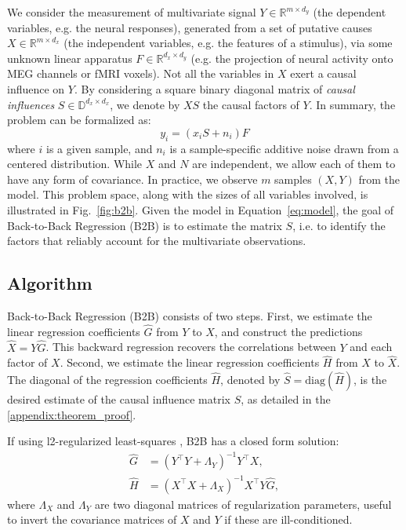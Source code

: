\documentclass[preprint,12pt,3p]{elsarticle}
\begin{document}
We consider the measurement of multivariate signal $Y \in \mathbb{R}^{m \times
d_y}$ (the dependent variables, e.g. the neural responses),
generated from a set of putative causes $X \in \mathbb{R}^{m \times
d_x}$ (the independent variables, e.g. the features of a stimulus),
via some unknown linear apparatus $F \in \mathbb{R}^{d_x \times d_y}$ (e.g. the
projection of neural activity onto MEG channels or fMRI voxels).
%
Not all the variables in $X$ exert a causal influence on $Y$.
%
By considering a square binary diagonal matrix of \emph{causal influences} $S
\in \mathbb{D}^{d_x \times d_x}$, we denote by $XS$ the causal factors of $Y$.
%
In summary, the problem can be formalized as:
%
\begin{equation}
    y_i = (x_i S + n_i) F
    \label{eq:model}
\end{equation}
%
where $i$ is a given sample, and $n_i$ is a sample-specific additive noise drawn from a
centered distribution.
%
While $X$ and $N$ are independent, we allow each of
them to have any form of covariance.
%
In practice, we observe $m$ samples $(X, Y)$ from the model.
%
This problem space, along with the sizes of all variables involved, is
illustrated in Fig.~\ref{fig:b2b}.
%
Given the model in Equation~\cref{eq:model}, the goal of Back-to-Back
Regression (B2B) is to estimate the matrix $S$, i.e. to identify the factors
that reliably account for the multivariate observations.

\subsection{Algorithm}

Back-to-Back Regression (B2B) consists of two steps.
%
First, we estimate the linear regression coefficients $\hat G$ from $Y$ to $X$,
and construct the predictions $\hat X = Y \hat G$.
%
This backward regression recovers the correlations between $Y$ and each factor
of $X$.
%
Second, we estimate the linear regression coefficients $\hat H$ from $X$ to
$\hat X$.
%
The diagonal of the regression coefficients $\hat H$, denoted by $\hat{S} =
\text{diag}(\hat{H})$, is the desired estimate of the causal influence matrix
$S$, as detailed in the \ref{appendix:theorem_proof}.

If using l2-regularized least-squares \citep{hoerl1959optimum, rifkin2007notes},
B2B has a closed form solution:
\begin{align}
    \hat G &= (Y^\top Y + \Lambda_Y)^{-1} Y^\top X,\label{eq:solG}\\
    \hat H &=(X^\top X + \Lambda_X)^{-1} X^\top Y \hat G,\label{eq:solH}
\end{align}
%
where $\Lambda_X$ and $\Lambda_Y$ are two diagonal matrices of regularization
parameters, useful to invert the covariance matrices of $X$ and $Y$ if these are
ill-conditioned.
\end{document}
